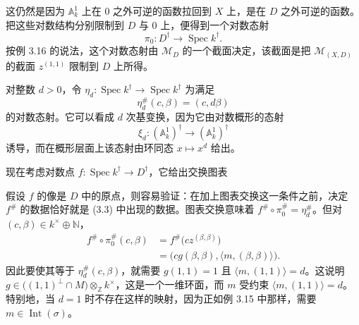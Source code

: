 
这仍然是因为 $\mathbb{A}^1_k$ 上在 $0$ 之外可逆的函数拉回到 $X$ 上，是在 $D$ 之外可逆的函数。把这些对数结构分别限制到 $D$ 与 $0$ 上，便得到一个对数态射
\[
  \pi_0: D^{\dagger}\longrightarrow \operatorname{Spec} k^{\dagger}.
\]
按例 3.16 的说法，这个对数态射由 $\mathcal{M}_D$ 的一个截面决定，该截面是把 $\mathcal{M}_{(X,D)}$ 的截面 $z^{(1,1)}$ 限制到 $D$ 上所得。

对整数 $d>0$，令 $\eta_d:\operatorname{Spec} k^{\dagger}\to\operatorname{Spec} k^{\dagger}$ 为满足
\[
  \eta_d^{\#}(c,\beta)=(c,d\beta)
\]
的对数态射。它可以看成 $d$ 次基变换，因为它由对数概形的态射
\[
  \xi_d:(\mathbb{A}^1_k)^{\dagger}\longrightarrow(\mathbb{A}^1_k)^{\dagger}
\]
诱导，而在概形层面上该态射由环同态 $x\mapsto x^d$ 给出。

现在考虑对数点 $f:\operatorname{Spec} k^{\dagger}\to D^{\dagger}$，它给出交换图表
\begin{center}
\end{center}
假设 $f$ 的像是 $D$ 中的原点，则容易验证：在加上图表交换这一条件之前，决定 $f^{\#}$ 的数据恰好就是 (3.3) 中出现的数据。图表交换意味着 $f^{\#}\circ\pi_0^{\#}=\eta_d^{\#}$。但对 $(c,\beta)\in k^{\times}\oplus\mathbb{N}$，
\begin{align*}
  f^{\#}\circ\pi_0^{\#}(c,\beta)
  &=f^{\#}\bigl(cz^{(\beta,\beta)}\bigr)\\
  &=\bigl(cg(\beta,\beta),\langle m,(\beta,\beta)\rangle\bigr).
\end{align*}
因此要使其等于 $\eta_d^{\#}(c,\beta)$，就需要 $g(1,1)=1$ 且 $\langle m,(1,1)\rangle=d$。这说明 $g\in\bigl((1,1)^{\perp}\cap M\bigr)\otimes_{\mathbb{Z}}k^{\times}$，这是一个一维环面，而 $m$ 受约束 $\langle m,(1,1)\rangle=d$。特别地，当 $d=1$ 时不存在这样的映射，因为正如例 3.15 中那样，需要 $m\in\operatorname{Int}(\sigma)$。

